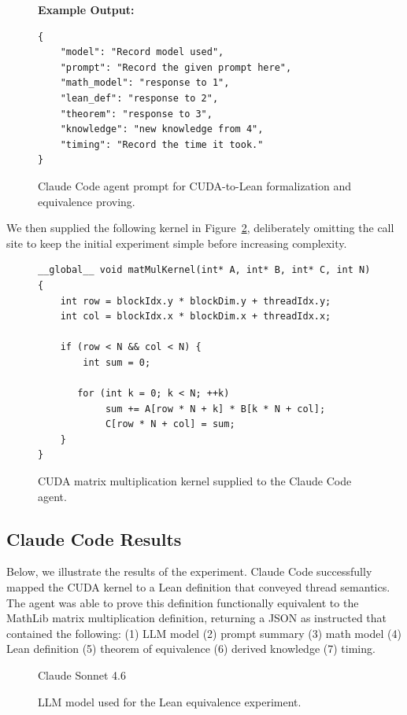 \documentclass{article}
\begin{document}
\begin{figure}[H]
\begin{promptbox}
\medskip
\textbf{Example Output:}
\begin{verbatim}
{
    "model": "Record model used",
    "prompt": "Record the given prompt here",
    "math_model": "response to 1",
    "lean_def": "response to 2",
    "theorem": "response to 3",
    "knowledge": "new knowledge from 4",
    "timing": "Record the time it took."
}
\end{verbatim}
\end{promptbox}
\caption{Claude Code agent prompt for CUDA-to-Lean formalization and equivalence proving.}
\label{fig:lean-agent-prompt}
\end{figure}

We then supplied the following kernel in Figure~\ref{fig:matmul-kernel}, deliberately omitting the call site to keep the initial experiment simple before increasing complexity.

\begin{figure}[H]
\begin{verbatim}
__global__ void matMulKernel(int* A, int* B, int* C, int N) {
    int row = blockIdx.y * blockDim.y + threadIdx.y;
    int col = blockIdx.x * blockDim.x + threadIdx.x;

    if (row < N && col < N) {
        int sum = 0;

       for (int k = 0; k < N; ++k)
            sum += A[row * N + k] * B[k * N + col];
            C[row * N + col] = sum;
    }
}
\end{verbatim}
\caption{CUDA matrix multiplication kernel supplied to the Claude Code agent.}
\label{fig:matmul-kernel}
\end{figure}

\subsection{Claude Code Results}

Below, we illustrate the results of the experiment. Claude Code successfully mapped the CUDA kernel to a Lean definition that conveyed thread semantics. The agent was able to prove this definition functionally equivalent to the MathLib matrix multiplication definition, returning a JSON as instructed that contained the following: (1) LLM model (2) prompt summary (3) math model (4) Lean definition (5) theorem of equivalence (6) derived knowledge (7) timing.

\begin{figure}[H]
\begin{promptbox}
Claude Sonnet 4.6
\end{promptbox}
\caption{LLM model used for the Lean equivalence experiment.}
\label{fig:lean-model}
\end{figure}
\end{document}
